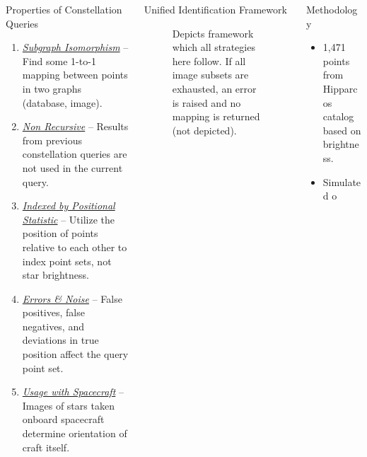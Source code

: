 \documentclass{beamer}
\newlength{\onecolwid}
\newlength{\twocolwid}
\begin{document}
\begin{frame}[t]
\begin{columns}[t]
\begin{column}{\onecolwid}
				\begin{block}{Properties of Constellation Queries}
					\begin{enumerate}
						\setlength\itemsep{1cm}
						\item \parbox{\linewidth}{
							\underline{\emph{Subgraph Isomorphism}} -- Find some 1-to-1 mapping between points in two graphs (database, image).
							}
						\item \parbox{\linewidth}{
							\underline{\emph{Non Recursive}} -- Results from previous constellation queries are not used in the current query.
							}
						\item \parbox{\linewidth}{
							\underline{\emph{Indexed by Positional Statistic}} -- Utilize the position of points relative to each other to index point sets, not star brightness.
							}
						\item \parbox{\linewidth}{
							\underline{\emph{Errors \& Noise}} -- False positives, false negatives, and deviations in true position affect the query point set.
							}
						\item \parbox{\linewidth}{
							\underline{\emph{Usage with Spacecraft}} -- Images of stars taken onboard spacecraft determine orientation of craft itself.
							}
					\end{enumerate}
				\end{block}
			\end{column}
			
			\begin{column}{\twocolwid}
				\begin{columns}[t,totalwidth=\twocolwid]
					\begin{column}{\onecolwid}\vspace{-.6in} %
						\begin{block}{Unified Identification Framework}
							\begin{figure}
								\centering
								
								\caption{
									Depicts framework which all strategies here follow.
									If all image subsets are exhausted, an error is raised and no mapping is returned (not depicted).
								}
							\end{figure}
						\end{block}
					\end{column}
					
					\begin{column}{\onecolwid}\vspace{-.6in} %
						\begin{block}{Methodology}
							\begin{itemize}
								\item 1{,}471 points from Hipparcos catalog based on brightness.
								\item Simulated o
							\end{itemize}
						\end{block}
				

\end{column}
\end{columns}
\end{column}
\end{columns}
\end{frame}
\end{document}

